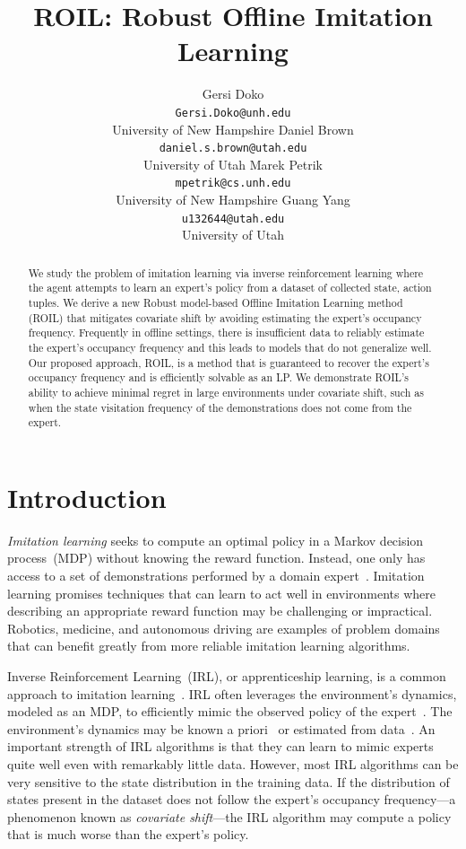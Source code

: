 \documentclass[10pt]{article}
\title{ROIL: Robust Offline Imitation Learning}
\author{Gersi Doko \\
        \texttt{Gersi.Doko@unh.edu} \\
        University of New Hampshire 
        \And 
        Daniel Brown \\
        \texttt{daniel.s.brown@utah.edu} \\
        University of Utah 
        \And
        Marek Petrik \\        
        \texttt{mpetrik@cs.unh.edu} \\
        University of New Hampshire 
        \And
        Guang Yang \\ 
        \texttt{u132644@utah.edu} \\
        University of Utah 
      }
\renewcommand{\cite}{\citep}
\theoremstyle{plain}
\theoremstyle{remark}
\begin{document}
\maketitle

\begin{abstract}
We study the problem of imitation learning via inverse reinforcement learning where the agent attempts to learn an expert's policy from a dataset of collected state, action tuples. We derive a new Robust model-based Offline Imitation Learning method (ROIL) that mitigates covariate shift by avoiding estimating the expert's occupancy frequency. Frequently in offline settings, there is insufficient data to reliably estimate the expert's occupancy frequency and this leads to models that do not generalize well. Our proposed approach, ROIL, is a method that is guaranteed to recover the expert's occupancy frequency and is efficiently solvable as an LP. We demonstrate ROIL's ability to achieve minimal regret in large environments under covariate shift, such as when the state visitation frequency of the demonstrations does not come from the expert.
\end{abstract}

\section{Introduction}

\emph{Imitation learning} seeks to compute an optimal policy in a Markov decision process~(MDP) without knowing the reward function. Instead, one only has access to a set of demonstrations performed by a domain expert~\cite{chang2021mitigating, Panaganti2023, Spencer2021, Rashidinejad2022}. Imitation learning promises techniques that can learn to act well in environments where describing an appropriate reward function may be challenging or impractical. Robotics, medicine, and autonomous driving are examples of problem domains that can benefit greatly from more reliable imitation learning algorithms. 

Inverse Reinforcement Learning~(IRL), or apprenticeship learning, is a common approach to imitation learning~\cite{abbeel2004, ziebart2008maximum,fu2018learning}. IRL often leverages the environment's dynamics, modeled as an MDP, to efficiently mimic the observed policy of the expert~\cite{arora2021survey}. The environment's dynamics may be known a priori~\cite{Syed2008, lacotte2019} or estimated from data~\cite{finn2016guided,Ho2016,chang2021mitigating}. An important strength of IRL algorithms is that they can learn to mimic experts quite well even with remarkably little data. However, most IRL algorithms can be very sensitive to the state distribution in the training data. If the distribution of states present in the dataset does not follow the expert's occupancy frequency---a phenomenon known as \emph{covariate shift}---the IRL algorithm may compute a policy that is much worse than the expert's policy. 
\end{document}
